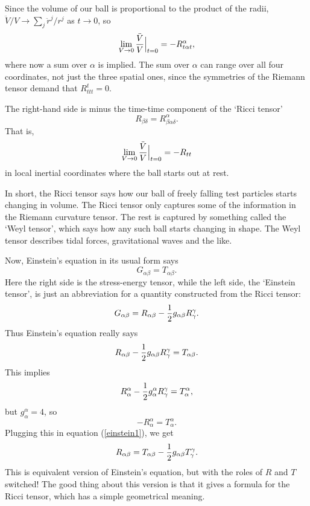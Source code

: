Since the volume of our ball is proportional to the product of the radii,
$\ddot V/V \to \sum_j \ddot r^j/r^j$ as $t\to 0$, so
\[    \lim_{V \to 0} {\ddot V\over V}\Bigr|_{t = 0} = 
 - R^\alpha_{t\alpha t} , \]
where now a sum over $\alpha$ is implied.  The sum over $\alpha$
can range over all four coordinates, not just the
three spatial ones, since the symmetries of
the Riemann tensor demand that  $R^{t}_{ttt}=0$.

The right-hand side is minus the time-time component 
of the `Ricci tensor'
\[      R_{\beta\delta} =  R^\alpha_{\beta\alpha\delta}. \]
That is,
\begin{equation} 
 \lim_{V \to 0} {\ddot V\over V}\Bigr|_{t = 0} = 
 - R_{tt} \label{contract} \end{equation}
in local inertial coordinates where the ball starts out at rest.

In short, the Ricci tensor says how our ball of freely 
falling test particles starts changing in volume.  The Ricci
tensor only captures some of the information in the Riemann curvature
tensor.  The rest is captured by something called the `Weyl tensor',
which says how any such ball starts changing in shape.  The Weyl tensor
describes tidal forces, gravitational waves and the like.

Now, Einstein's equation in its usual form says 
\[   G_{\alpha \beta} = T_{\alpha \beta} .\]
Here the right side is the stress-energy tensor, while the left side,
the `Einstein tensor', is just an abbreviation for a
quantity constructed from the Ricci tensor:
\[    G_{\alpha \beta} = R_{\alpha \beta} - {1\over 2}g_{\alpha \beta}
R^\gamma_\gamma. \]
Thus Einstein's equation really says
\begin{equation}   R_{\alpha \beta} - {1\over 2}g_{\alpha \beta}
R^\gamma_\gamma  = T_{\alpha \beta} . \label{einstein1} \end{equation}
This implies 
\[   R^\alpha_\alpha -  {1\over 2}g^\alpha_\alpha
R^\gamma_\gamma  = T^\alpha_\alpha, \]
but $g^\alpha_\alpha = 4$, so 
\[   -R^\alpha_\alpha = T^\alpha_\alpha .\]
Plugging this in equation (\ref{einstein1}), we get
\begin{equation}   R_{\alpha \beta} = T_{\alpha \beta} 
- {1\over 2}g_{\alpha \beta}  T^\gamma_\gamma 
\label{einstein2}. \end{equation}
This is equivalent version of Einstein's equation, 
but with the roles of $R$ and $T$ switched!  The good thing about
this version is that it gives a formula for the Ricci tensor, which
has a simple geometrical meaning.

